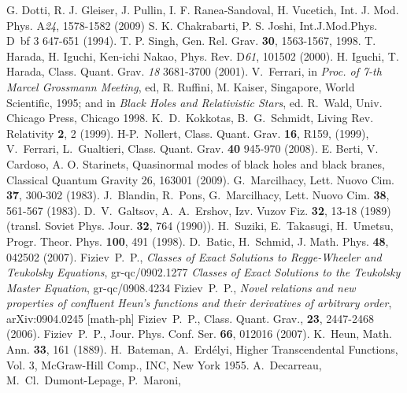 \documentclass[prd,aps,twocolumn,leterpaper,preprintnumbers]{revtex4}
\numberwithin{equation}{section}
\begin{document}
\begin{thebibliography}{}
                  G. Dotti, R. J. Gleiser, J. Pullin, I. F. Ranea-Sandoval, H. Vucetich,
                  Int. J. Mod. Phys. A{\em 24}, 1578-1582 (2009)
%
     S. K. Chakrabarti, P. S. Joshi, Int.J.Mod.Phys. D{\ bf 3}  647-651 (1994).
                    T. P. Singh, Gen. Rel. Grav. {\bf 30}, 1563-1567, 1998.
                    T. Harada, H. Iguchi, Ken-ichi Nakao, Phys. Rev. D{\em 61}, 101502  (2000).
                    H. Iguchi, T. Harada, Class. Quant. Grav. {\em 18}  3681-3700 (2001).
%
       V.~Ferrari,  in {\em Proc. of 7-th Marcel Grossmann Meeting},
                    ed, R. Ruffini, M. Kaiser, Singapore, World Scientific, 1995;
                    and  in {\em Black Holes and Relativistic
                    Stars}, ed. R.~Wald, Univ. Chicago Press, Chicago 1998.
                    K.~D.~Kokkotas, B.~G.~Schmidt,  Living Rev. Relativity {\bf 2}, 2 (1999).
                    H-P.~Nollert,  Class. Quant. Grav. {\bf 16}, R159,
                    (1999),  V.~Ferrari, L.~Gualtieri, Class. Quant. Grav. {\bf 40} 945-970 (2008).
                    E. Berti, V. Cardoso, A. O. Starinets, {Quasinormal modes of black holes and black branes},
                    Classical Quantum Gravity 26, 163001 (2009).
%
  G.~Marcilhacy, Lett. Nuovo Cim. {\bf 37}, 300-302 (1983).
                    J.~Blandin, R.~Pons, G.~Marcilhacy, Lett. Nuovo Cim. {\bf 38}, 561-567 (1983).
                    D.~V.~Galtsov, A.~A.~Ershov, Izv. Vuzov Fiz. {\bf 32}, 13-18 (1989) (transl. Soviet Phys. Jour. {\bf 32}, 764 (1990)).
                    H.~Suziki, E.~Takasugi, H.~Umetsu, Progr. Theor. Phys. {\bf 100}, 491 (1998).
                    D.~Batic, H.~Schmid, J. Math. Phys. {\bf 48}, 042502 (2007).
%
 Fiziev~P.~P., {\em Classes of Exact Solutions to Regge-Wheeler and Teukolsky  Equations}, gr-qc/0902.1277
                                {\em Classes of Exact Solutions to the Teukolsky  Master Equation}, gr-qc/0908.4234
%
 Fiziev~P.~P., {\em Novel relations and new properties of confluent Heun's functions and their derivatives of arbitrary order},
                  arXiv:0904.0245 [math-ph]
%
 Fiziev~P.~P., Class. Quant. Grav., {\bf 23}, 2447-2468 (2006).
                  Fiziev~P.~P., Jour. Phys. Conf. Ser. {\bf 66}, 012016 (2007).
%
      K.~Heun,  Math. Ann. {\bf 33}, 161 (1889).
                    H.~Bateman, A.~Erd\'elyi,  {Higher Transcendental
                    Functions}, Vol. 3, McGraw-Hill Comp., INC, New York 1955.
                    A.~Decarreau, M.~Cl.~Dumont-Lepage, P.~Maroni,

\end{thebibliography}
\end{document}
